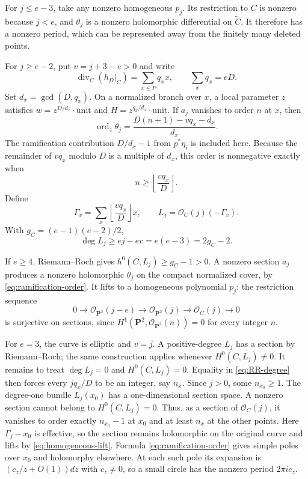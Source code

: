 \documentclass[11pt]{article}
\numberwithin{equation}{section}
\theoremstyle{definition}
\theoremstyle{remark}
\newcommand{\PP}{\mathbf P}
\newcommand{\OO}{\mathcal O}
\DeclareMathOperator{\ord}{ord}
\DeclareMathOperator{\divisor}{div}
\begin{document}
For $j\le e-3$, take any nonzero homogeneous $p_j$.
Its restriction to $C$ is nonzero because $j<e$, and
$\theta_j$ is a nonzero holomorphic differential on
$\widetilde C$. It therefore has a nonzero period, which
can be represented away from the finitely many deleted
points.

For $j\ge e-2$, put $v=j+3-e>0$ and write
\[
 \divisor_C(h_D|_C)=\sum_{x\in P}q_xx,\qquad
 \sum_xq_x=eD.
\]
Set $d_x=\gcd(D,q_x)$. On a normalized branch over $x$,
a local parameter $z$ satisfies
$w=z^{D/d_x}\cdot\mathrm{unit}$ and
$H=z^{q_x/d_x}\cdot\mathrm{unit}$. If $a_j$ vanishes to
order $n$ at $x$, then
\begin{equation}\label{eq:ramification-order}
 \ord_z\theta_j=\frac{D(n+1)-vq_x-d_x}{d_x}.
\end{equation}
The ramification contribution $D/d_x-1$ from $p^*\eta_i$
is included here. Because the remainder of $vq_x$ modulo
$D$ is a multiple of $d_x$, this order is nonnegative
exactly when
\begin{equation}\label{eq:floor-condition}
 n\ge\left\lfloor\frac{vq_x}{D}\right\rfloor.
\end{equation}
Define
\begin{equation}\label{eq:RR-line-bundle}
 \Gamma_v=\sum_x\left\lfloor\frac{vq_x}{D}\right\rfloor x,
 \qquad L_j=\OO_C(j)(-\Gamma_v).
\end{equation}
With $g_C=(e-1)(e-2)/2$,
\begin{equation}\label{eq:RR-degree}
 \deg L_j\ge ej-ev=e(e-3)=2g_C-2.
\end{equation}

If $e\ge4$, Riemann--Roch gives
$h^0(C,L_j)\ge g_C-1>0$. A nonzero section $a_j$ produces
a nonzero holomorphic $\theta_j$ on the compact normalized
cover, by \eqref{eq:ramification-order}. It lifts to a
homogeneous polynomial $p_j$: the restriction sequence
\begin{equation}\label{eq:homogeneous-lift}
 0\longrightarrow\OO_{\PP^2}(j-e)
 \longrightarrow\OO_{\PP^2}(j)
 \longrightarrow\OO_C(j)\longrightarrow0
\end{equation}
is surjective on sections, since
$H^1(\PP^2,\OO_{\PP^2}(n))=0$ for every integer $n$.

For $e=3$, the curve is elliptic and $v=j$. A
positive-degree $L_j$ has a section by Riemann--Roch;
the same construction applies whenever $H^0(C,L_j)\ne0$.
It remains to treat $\deg L_j=0$ and
$H^0(C,L_j)=0$. Equality in \eqref{eq:RR-degree} then
forces every $jq_x/D$ to be an integer, say $n_x$.
Since $j>0$, some $n_{x_0}\ge1$. The degree-one bundle
$L_j(x_0)$ has a one-dimensional section space. A
nonzero section cannot belong to $H^0(C,L_j)=0$.
Thus, as a section of $\OO_C(j)$, it vanishes to order
exactly $n_{x_0}-1$ at $x_0$
and at least $n_x$ at the other points. Here
$\Gamma_j-x_0$ is effective, so the section remains
holomorphic on the original curve and lifts by
\eqref{eq:homogeneous-lift}. Formula
\eqref{eq:ramification-order} gives simple poles over
$x_0$ and holomorphy elsewhere. At each such pole its
expansion is $(c_z/z+O(1))dz$ with $c_z\ne0$, so a small
circle has the nonzero period $2\pi i c_z$.
\end{document}
